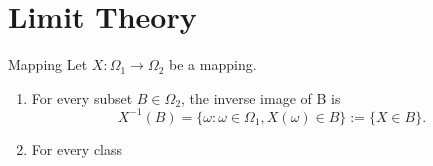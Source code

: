 \chapter{Limit Theory}

\begin{definition}{Mapping}{}
    Let $X:\Omega_1\rightarrow\Omega_2$ be a mapping.
    \begin{enumerate}
        \item
              For every subset $B\in\Omega_2$, the inverse image of B is
              \begin{equation*}
                  X^{-1}(B)=\{\omega:\omega\in\Omega_1,X(\omega)\in B\}:=\{X\in B\}.
              \end{equation*}
        \item
              For every class
    \end{enumerate}
\end{definition}
